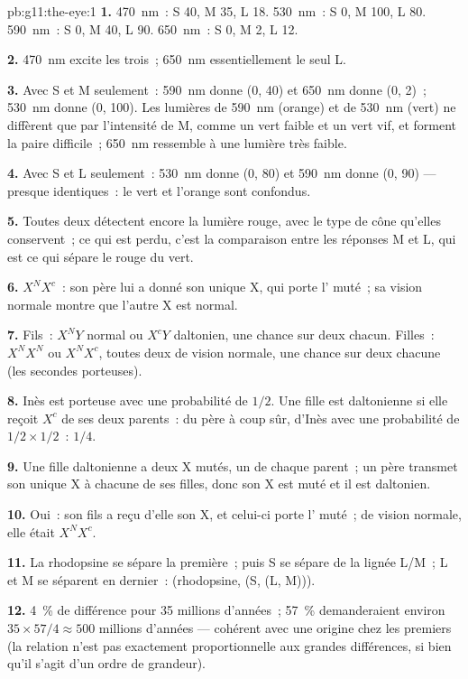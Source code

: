 \begin{solution}{pb:g11:the-eye:1}
\textbf{1.} \qty{470}{nm}~: S 40, M 35, L 18. \qty{530}{nm}~: S 0, M
100, L 80. \qty{590}{nm}~: S 0, M 40, L 90. \qty{650}{nm}~: S 0, M 2,
L 12.

\textbf{2.} \qty{470}{nm} excite les trois~; \qty{650}{nm}
essentiellement le seul L.

\textbf{3.} Avec S et M seulement~: \qty{590}{nm} donne (0, 40) et
\qty{650}{nm} donne (0, 2)~; \qty{530}{nm} donne (0, 100). Les lumières
de \qty{590}{nm} (orange) et de \qty{530}{nm} (vert) ne diffèrent que
par l'intensité de M, comme un vert faible et un vert vif, et forment
la paire difficile~; \qty{650}{nm} ressemble à une lumière très faible.

\textbf{4.} Avec S et L seulement~: \qty{530}{nm} donne (0, 80) et
\qty{590}{nm} donne (0, 90) --- presque identiques~: le vert et
l'orange sont confondus.

\textbf{5.} Toutes deux détectent encore la lumière rouge, avec le type
de cône qu'elles conservent~; ce qui est perdu, c'est la comparaison
entre les réponses M et L, qui est ce qui sépare le rouge du vert.

\textbf{6.} $X^NX^c$~: son père lui a donné son unique X, qui porte
l' muté~; sa vision normale montre que l'autre X est normal.

\textbf{7.} Fils~: $X^NY$ normal ou $X^cY$ daltonien, une chance sur
deux chacun. Filles~: $X^NX^N$ ou $X^NX^c$, toutes deux de vision
normale, une chance sur deux chacune (les secondes porteuses).

\textbf{8.} Inès est porteuse avec une probabilité de $1/2$. Une fille
est daltonienne si elle reçoit $X^c$ de ses deux parents~: du père à
coup sûr, d'Inès avec une probabilité de $1/2 \times 1/2$~: $1/4$.

\textbf{9.} Une fille daltonienne a deux  X mutés, un de
chaque parent~; un père transmet son unique X à chacune de ses filles,
donc son X est muté et il est daltonien.

\textbf{10.} Oui~: son fils a reçu d'elle son X, et celui-ci porte
l' muté~; de vision normale, elle était $X^NX^c$.

\textbf{11.} La rhodopsine se sépare la première~; puis S se sépare de
la lignée L/M~; L et M se séparent en dernier~:
(rhodopsine, (S, (L, M))).

\textbf{12.} 4~\% de différence pour 35 millions d'années~; 57~\%
demanderaient environ $35 \times 57/4 \approx 500$ millions d'années
--- cohérent avec une origine chez les premiers  (la relation
n'est pas exactement proportionnelle aux grandes différences, si bien
qu'il s'agit d'un ordre de grandeur).


\end{solution}
